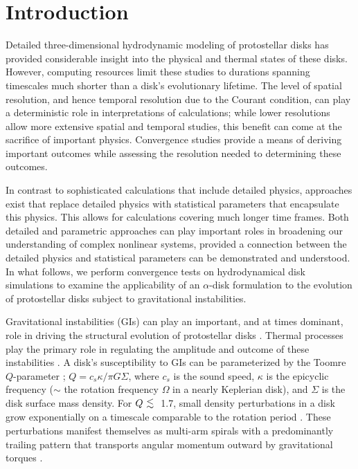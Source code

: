 \documentclass[manuscript]{aastex}
\newcommand{\al}{\mbox{ \raisebox{-.8ex}{$\stackrel{\textstyle <}{\sim}$} }}
\begin{document}
\section{Introduction}

Detailed three-dimensional hydrodynamic modeling of protostellar disks has provided considerable insight into the physical and thermal states of these disks.  However,  computing resources limit these studies to durations spanning timescales much shorter than a disk's evolutionary lifetime. The level of spatial resolution, and hence temporal resolution due to the Courant condition, can play a deterministic role in interpretations of calculations; while lower resolutions allow more extensive spatial and temporal studies, this benefit can come at the sacrifice of important physics.  Convergence studies provide a means 
of deriving important outcomes while assessing the resolution needed to determining these outcomes.  

In contrast to sophisticated calculations that include detailed physics, 
approaches exist that replace detailed physics with statistical parameters that encapsulate this physics.  This
allows for calculations covering much longer time frames.  Both detailed and 
parametric
approaches can play important roles in broadening our understanding of complex nonlinear systems, provided a connection between the detailed physics and statistical parameters can be demonstrated and understood. In what follows, we perform convergence 
tests on hydrodynamical disk simulations to examine the applicability of an $\alpha$-disk 
formulation \citep{shakura1973} to  the
evolution of protostellar disks subject to gravitational instabilities.   

Gravitational instabilities (GIs) can play an important, and at times dominant, role in driving the structural 
evolution of  protostellar disks \citep[for reviews, see][]{durisen2005, durisen2007}.
Thermal processes play the primary role in regulating the amplitude and outcome of these instabilities \citep{pickett1998,pickett2000,pickett2003,nelson1998,nelson2000a, mejia2005}. A disk's susceptibility to GIs can be parameterized by the Toomre $Q$-parameter \citep{toomre1981};  $Q = c_s \kappa / \pi G \Sigma$, where $c_s$ is the sound speed, $\kappa$ is the epicyclic frequency ($\sim$ the rotation frequency 
$\Omega$ in a nearly Keplerian disk), and $\Sigma$ is the disk surface mass density. For $Q \al$ 1.7,  small density perturbations in a disk grow exponentially on a timescale comparable to the rotation period \citep{durisen2007}. These perturbations manifest themselves as multi-arm spirals with a predominantly trailing pattern that transports angular momentum outward by gravitational torques \citep{larson1984,boss1984,durisen1986,papaloizou1991, laughlin1994,nelson1998,pickett1998}. 
\end{document}
